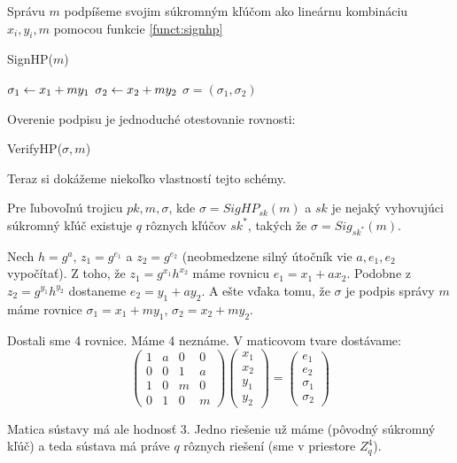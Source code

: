 Správu $m$ podpíšeme svojim súkromným kľúčom ako lineárnu kombináciu
$x_i, y_i, m$ pomocou funkcie \ref{funct:signhp}
\begin{function}[h!]
    \caption{SignHP($m$)}
    \label{funct:signhp}
    $\sigma_1 \leftarrow x_1 + m y_1$\;
    $\sigma_2 \leftarrow x_2 + m y_2$\;
    \Return $\sigma=(\sigma_1,\sigma_2)$\;
\end{function}

Overenie podpisu je jednoduché otestovanie
rovnosti:
\begin{function}[h!]
    \caption{VerifyHP($\sigma,m$)}
\end{function}

Teraz si dokážeme niekoľko vlastností tejto schémy.

\begin{lema}
Pre ľubovoľnú trojicu $pk, m, \sigma$, kde $\sigma = SigHP_{sk}(m)$
a $sk$ je nejaký vyhovujúci súkromný kľúč
existuje $q$ rôznych kľúčov $sk^*$, takých že $\sigma = Sig_{sk^*}(m)$.
\end{lema}

\begin{dokaz}
Nech $h = g^a$, $z_1 = g^{e_1}$ a $z_2 = g^{e_2}$ 
(neobmedzene silný útočník vie $a, e_1, e_2$ vypočítať).
Z toho, že $z_1 = g^{x_1} h^{x_2}$ máme rovnicu $e_1 = x_1 + ax_2$.
Podobne z $z_2 = g^{y_1} h^{y_2}$ dostaneme $e_2 = y_1 + a y_2$.
A ešte vďaka tomu, že $\sigma$ je podpis správy $m$ máme rovnice
$\sigma_1 = x_1 + my_1$, $\sigma_2 = x_2 + my_2$. 

Dostali sme 4 rovnice. Máme 4 neznáme. V maticovom tvare dostávame:
\begin{equation*}
    \left ( \begin{matrix}
                1 & a & 0 & 0 \\
                0 & 0 & 1 & a \\
                1 & 0 & m & 0 \\
                0 & 1 & 0 & m
            \end{matrix}
    \right )
    \left ( \begin{matrix}
                x_1 \\
                x_2 \\
                y_1 \\
                y_2
            \end{matrix}
    \right )
    =
    \left ( \begin{matrix} 
                e_1 \\
                e_2 \\
                \sigma_1\\
                \sigma_2
            \end{matrix}
    \right )
\end{equation*}

Matica sústavy má ale hodnosť $3$. Jedno riešenie už máme (pôvodný
súkromný kľúč) a teda sústava má práve $q$ rôznych riešení (sme v
priestore $Z_q^4$).

\end{dokaz}

